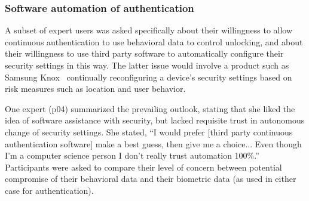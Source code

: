 

\subsubsection{Software automation of authentication}
A subset of expert users was asked specifically about their willingness to allow
continuous authentication to use behavioral data to control unlocking, and about
their willingness to use third party software to automatically configure their
security settings in this way. The latter issue would involve a product such as
Samsung Knox~ continually reconfiguring a device's security settings based on
risk measures such as location and user
behavior. %

One expert (p04) summarized the prevailing outlook, stating that she liked the
idea of software assistance with security, but lacked requisite trust in
autonomous change of security settings. She stated, ``I would prefer [third
party continuous authentication software] make a best guess, then give me a
choice... Even though I'm a computer science person I don't really trust
automation 100\%.'' Participants were asked to compare their level of concern
between potential compromise of their behavioral data and their biometric data
(as used in either case for authentication).

